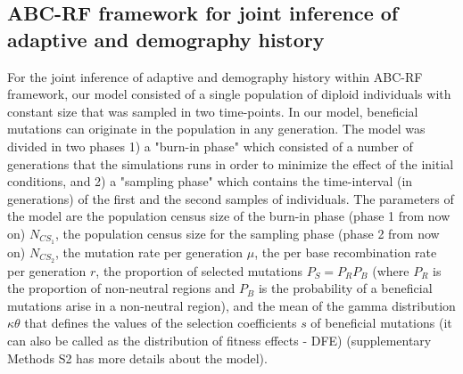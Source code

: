 \documentclass[12pt]{article}
\begin{document}
\subsection*{ABC-RF framework for joint inference of adaptive and demography history}

For the joint inference of adaptive and demography history within ABC-RF framework, our model consisted of a single population of diploid individuals with constant size that was sampled in two time-points. In our model, beneficial mutations can originate in the population in any generation.  The model was divided in two phases 1) a "burn-in phase" which consisted of a number of generations that the simulations runs in order to minimize the effect of the initial conditions, and 2) a "sampling phase" which contains the time-interval (in generations) of the first and the second samples of individuals. The parameters of the model are the population census size of the burn-in phase (phase 1 from now on) $N_{CS_{1}}$, the population census size for the sampling phase (phase 2 from now on) $N_{CS_{2}}$, the mutation rate per generation $\mu$, the per base recombination rate per generation $r$, the proportion of selected mutations $P_{S} = P_{R}P_{B}$ (where $P_{R}$ is the proportion of non-neutral regions and $P_{B}$ is the probability of a beneficial mutations arise in a non-neutral region), and the mean of the gamma distribution $\kappa\theta$ that defines the values of the selection coefficients $s$ of beneficial mutations (it can also be called as the distribution of fitness effects - DFE) (supplementary Methods S2 has more details about the model).
\end{document}
